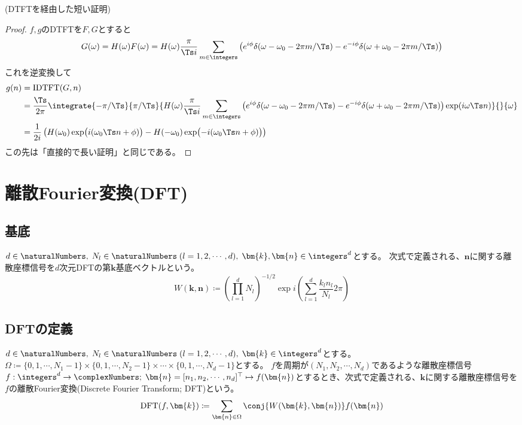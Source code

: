 				(DTFTを経由した短い証明)
				\begin{proof}
					\quad\par
					$f,g$のDTFTを$F,G$とすると
					\[ G(\omega) = H(\omega)F(\omega) = H(\omega)\frac{\pi}{\Ts i}\sum_{m\in\integers}\left(e^{i\phi}\delta(\omega-\omega_0 - 2\pi m/\Ts) - e^{-i\phi}\delta(\omega+\omega_0 - 2\pi m/\Ts)\right) \]
					これを逆変換して
					\begin{align*}
						g(n) &= \text{IDTFT}(G,n) \\
						&= \frac{\Ts}{2\pi}\integrate{-\pi/\Ts}{\pi/\Ts}{H(\omega)\frac{\pi}{\Ts i}\sum_{m\in\integers}\left(e^{i\phi}\delta(\omega-\omega_0 - 2\pi m/\Ts) - e^{-i\phi}\delta(\omega+\omega_0 - 2\pi m/\Ts)\right)\exp(i\omega\Ts n)}{}{\omega} \\
						&= \frac{1}{2i}\left(H(\omega_0)\exp\bigl(i(\omega_0\Ts n+\phi)\bigr) - H(-\omega_0)\exp\bigl(-i(\omega_0\Ts n+\phi)\bigr)\right)
					\end{align*}
					この先は「直接的で長い証明」と同じである。
				\end{proof}
				\let\Ts\undefined
		\chapter{離散Fourier変換(DFT)}
			\section{基底}
				$d\in\naturalNumbers,\;N_l\in\naturalNumbers\;(l=1,2,\cdots,d),\;\bm{k},\bm{n}\in\integers^d$とする。
				次式で定義される、$\bm{n}$に関する離散座標信号を$d$次元DFTの第$\bm{k}$基底ベクトルという。
				\[ W(\bm{k},\bm{n}) \coloneqq \left(\prod_{l=1}^d N_l\right)^{-1/2} \exp i\left(\sum_{l=1}^d \frac{k_l n_l}{N_l}2\pi\right)\]

			\section{DFTの定義}
				\label{DFTの定義}
				$d\in\naturalNumbers,\;N_l\in\naturalNumbers\;(l=1,2,\cdots,d),\;\bm{k}\in\integers^d$とする。
				$\Omega \coloneqq \{0,1,\cdots,N_1-1\}\times\{0,1,\cdots,N_2-1\}\times\cdots\times\{0,1,\cdots,N_d-1\}$とする。
				$f$を周期が$(N_1,N_2,\cdots,N_d)$であるような離散座標信号$f: \integers^d\to\complexNumbers;\;\bm{n} = [n_1,n_2,\cdots,n_d]^\top \mapsto f(\bm{n})$とするとき、次式で定義される、$\bm{k}$に関する離散座標信号を$f$の離散Fourier変換(Discrete Fourier Transform; DFT)という。
				\[ \text{DFT}(f,\bm{k}) \coloneqq \sum_{\bm{n}\in\Omega} \conj{W(\bm{k},\bm{n})} f(\bm{n}) \]

